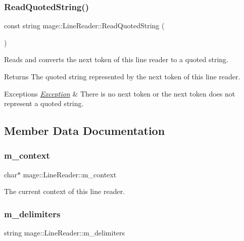 \subsubsection{\texorpdfstring{Read\+Quoted\+String()}{ReadQuotedString()}}
{\footnotesize\ttfamily const string mage\+::\+Line\+Reader\+::\+Read\+Quoted\+String (\begin{DoxyParamCaption}{ }\end{DoxyParamCaption})\hspace{0.3cm}{\ttfamily [protected]}}

Reads and converts the next token of this line reader to a quoted string.

\begin{DoxyReturn}{Returns}
The quoted string represented by the next token of this line reader. 
\end{DoxyReturn}

\begin{DoxyExceptions}{Exceptions}
{\em \hyperlink{classmage_1_1_exception}{Exception}} & There is no next token or the next token does not represent a quoted string. \\
\hline
\end{DoxyExceptions}


\subsection{Member Data Documentation}
\hypertarget{classmage_1_1_line_reader_a2f1cfe313dc89741386178e63a6b8b0c}{}\label{classmage_1_1_line_reader_a2f1cfe313dc89741386178e63a6b8b0c} 
\subsubsection{\texorpdfstring{m\+\_\+context}{m\_context}}
{\footnotesize\ttfamily char$\ast$ mage\+::\+Line\+Reader\+::m\+\_\+context\hspace{0.3cm}{\ttfamily [protected]}}

The current context of this line reader. \hypertarget{classmage_1_1_line_reader_a6de3398ac59fdd98f8c40cff6f5c1075}{}\label{classmage_1_1_line_reader_a6de3398ac59fdd98f8c40cff6f5c1075} 
\subsubsection{\texorpdfstring{m\+\_\+delimiters}{m\_delimiters}}
{\footnotesize\ttfamily string mage\+::\+Line\+Reader\+::m\+\_\+delimiters\hspace{0.3cm}{\ttfamily [private]}}


